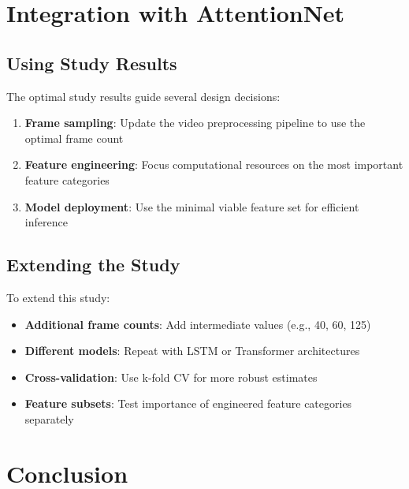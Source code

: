 \documentclass[11pt,a4paper]{article}
\begin{document}
\section{Integration with AttentionNet}\label{sec:integration}

\subsection{Using Study Results}

The optimal study results guide several design decisions:

\begin{enumerate}
  \item \textbf{Frame sampling}: Update the video preprocessing pipeline to use the optimal frame count
  \item \textbf{Feature engineering}: Focus computational resources on the most important feature categories
  \item \textbf{Model deployment}: Use the minimal viable feature set for efficient inference
\end{enumerate}

\subsection{Extending the Study}

To extend this study:

\begin{itemize}
  \item \textbf{Additional frame counts}: Add intermediate values (e.g., 40, 60, 125)
  \item \textbf{Different models}: Repeat with LSTM or Transformer architectures
  \item \textbf{Cross-validation}: Use k-fold CV for more robust estimates
  \item \textbf{Feature subsets}: Test importance of engineered feature categories separately
\end{itemize}

\section{Conclusion}\label{sec:conclusion}
\end{document}
